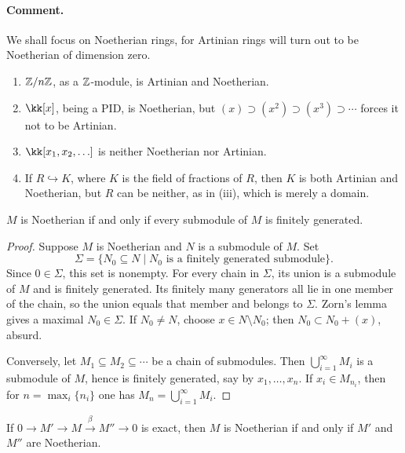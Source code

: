 \documentclass[11pt,a4paper]{article}
\begin{document}
\paragraph{Comment.}
We shall focus on Noetherian rings, for Artinian rings will turn out to be Noetherian of dimension zero.
\setcounter{example}{7}\begin{example}
\begin{enumerate}[label=(\roman*)]
\setcounter{enumi}{0}\item $\mathbb{Z}/n\mathbb{Z}$, as a $\mathbb{Z}$-module, is Artinian and Noetherian.
\setcounter{enumi}{1}\item $\kk[x]$, being a PID, is Noetherian, but $(x)\supset(x^2)\supset(x^3)\supset\cdots$ forces it not to be Artinian.
\setcounter{enumi}{2}\item $\kk[x_1,x_2,\ldots]$ is neither Noetherian nor Artinian.
\setcounter{enumi}{3}\item If $R\hookrightarrow K$, where $K$ is the field of fractions of $R$, then $K$ is both Artinian and Noetherian, but $R$ can be neither, as in (iii), which is merely a domain.
\end{enumerate}
\end{example}
\setcounter{theorem}{12}\begin{proposition}
$M$ is Noetherian if and only if every submodule of $M$ is finitely generated.
\end{proposition}
\begin{proof}
Suppose $M$ is Noetherian and $N$ is a submodule of $M$. Set
\[\Sigma=\{N_0\subseteq N\mid N_0\text{ is a finitely generated submodule}\}.\]
Since $0\in\Sigma$, this set is nonempty. For every chain in $\Sigma$, its union is a submodule of $M$ and is finitely generated.
Its finitely many generators all lie in one member of the chain, so the union equals that member and belongs to $\Sigma$. Zorn's lemma gives a maximal $N_0\in\Sigma$. If $N_0\ne N$, choose $x\in N\setminus N_0$; then $N_0\subset N_0+(x)$, absurd.

Conversely, let $M_1\subseteq M_2\subseteq\cdots$ be a chain of submodules. Then $\bigcup_{i=1}^{\infty}M_i$ is a submodule of $M$, hence is finitely generated, say by $x_1,\ldots,x_n$. If $x_i\in M_{n_i}$, then for $n=\max_i\{n_i\}$ one has $M_n=\bigcup_{i=1}^{\infty}M_i$.
\end{proof}
\setcounter{theorem}{13}\begin{proposition}
If $0\to M'\to M\xrightarrow{\beta}M''\to0$ is exact, then $M$ is Noetherian if and only if $M'$ and $M''$ are Noetherian.
\end{proposition}
\end{document}
